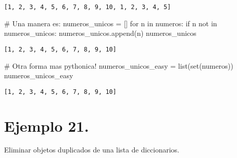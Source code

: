\documentclass[
  letterpaper,
  DIV=11,
  numbers=noendperiod]{scrreprt}
\newenvironment{Shaded}{\begin{snugshade}}{\end{snugshade}}
\newcommand{\BuiltInTok}[1]{\textcolor[rgb]{0.00,0.23,0.31}{#1}}
\newcommand{\CommentTok}[1]{\textcolor[rgb]{0.37,0.37,0.37}{#1}}
\newcommand{\ControlFlowTok}[1]{\textcolor[rgb]{0.00,0.23,0.31}{#1}}
\newcommand{\KeywordTok}[1]{\textcolor[rgb]{0.00,0.23,0.31}{#1}}
\newcommand{\NormalTok}[1]{\textcolor[rgb]{0.00,0.23,0.31}{#1}}
\newcommand{\OperatorTok}[1]{\textcolor[rgb]{0.37,0.37,0.37}{#1}}
\begin{document}
\begin{verbatim}
[1, 2, 3, 4, 5, 6, 7, 8, 9, 10, 1, 2, 3, 4, 5]
\end{verbatim}

\begin{Shaded}
\begin{Highlighting}[]
\CommentTok{\# Una manera es:}
\NormalTok{numeros\_unicos }\OperatorTok{=}\NormalTok{ []}
\ControlFlowTok{for}\NormalTok{ n }\KeywordTok{in}\NormalTok{ numeros:}
    \ControlFlowTok{if}\NormalTok{ n }\KeywordTok{not} \KeywordTok{in}\NormalTok{ numeros\_unicos:}
\NormalTok{        numeros\_unicos.append(n)}
\NormalTok{numeros\_unicos}
\end{Highlighting}
\end{Shaded}

\begin{verbatim}
[1, 2, 3, 4, 5, 6, 7, 8, 9, 10]
\end{verbatim}

\begin{Shaded}
\begin{Highlighting}[]
\CommentTok{\# Otra forma mas pythonica!}
\NormalTok{numeros\_unicos\_easy }\OperatorTok{=} \BuiltInTok{list}\NormalTok{(}\BuiltInTok{set}\NormalTok{(numeros))}
\NormalTok{numeros\_unicos\_easy}
\end{Highlighting}
\end{Shaded}

\begin{verbatim}
[1, 2, 3, 4, 5, 6, 7, 8, 9, 10]
\end{verbatim}

\section{\texorpdfstring{\textbf{Ejemplo
21.}}{Ejemplo 21.}}\label{ejemplo-21.}

Eliminar objetos duplicados de una lista de diccionarios.
\end{document}
